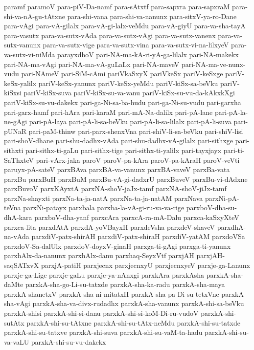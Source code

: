 {paramf
paramoV
para-piV-Da-namf
para-sAtxtf
para-sapxra
para-sapxraM
para-shi-va-nA-gu-tAtxne
para-shi-vana
para-shi-va-nanunx
para-sitxV-ya-ro-Dane
para-vAgi
para-vA-gilalx
para-vA-gi-lalx-veMdu
para-vA-giyU
para-va-sha-tayA
para-vasutx
para-va-sutx-vAda
para-va-sutx-vAgi
para-va-sutx-vanenx
para-va-sutx-vanunx
para-va-sutx-vige
para-va-sutx-vina
para-va-sutx-vi-na-lilxyeV
para-va-sutx-vi-niMda
parayxdhoV
pari-NA-ma-kA-ri-yA-ga-lilalx
pari-NA-makekx
pari-NA-ma-vAgi
pari-NA-ma-vA-guLaLx
pari-NA-maveV
pari-NA-ma-ve-nunx-vudu
pari-NAmeV
pari-SiM-cAmi
pariVkaSxyX
pariVkeSx
pariV-keSxge
pariV-keSx-yalilx
pariV-keSx-yanunx
pariV-keSx-yeMdu
pariV-kiSx-sa-beVku
pariV-kiSxsi
pariV-kiSx-suva
pariV-kiSx-su-va-vanu
pariV-kiSx-su-vu-da-kAkxkXgi
pariV-kiSx-su-vu-dakekx
pari-ga-Ni-sa-ba-hudu
pari-ga-Ni-su-vudu
pari-garxha
pari-garx-hamf
pari-hAra
pari-karaM
pari-mA-Na-dalilx
pari-pA-lane
pari-pA-la-ne-gAgi
pari-pA-laya
pari-pA-li-sa-beVku
pari-pA-li-sa-lilalx
pari-pA-li-suva
pari-pUNaR
pari-paM-thinw
pari-parx-shenxVna
pari-shiV-li-sa-beVku
pari-shiV-lisi
pari-shoV-dhane
pari-shu-dadhx-vAda
pari-shu-dadhx-vA-gilalx
pari-sithxge
pari-sithxti
pari-sithx-ti-gaLu
pari-sithx-tige
pari-sithx-ti-yalilx
pari-tayxjayx
pari-ti-SaThxteV
pari-vArx-jaka
paroV
paroV-pa-kAra
paroV-pa-kAraH
paroV-veVti
paruyx-pA-sateV
parxBAva
parxBA-va-vanunx
parxBA-vaveV
parxBa-vata
parxBu
parxBuH
parxBuM
parxBu-vA-gi-dadxrU
parxBuveV
parxBu-vi-dAdxne
parxBuvoV
parxKAyxtA
parxNA-shoV-jaJx-tamf
parxNA-shoV-jiJx-tamf
parxNa-shayxti
parxNa-ta-ja-natA
parxNa-ta-ja-natAM
parxNava
parxNi-pA-teVna
parxNi-patayx
parxbala
parxba-la-vA-gi-ru-va-va-rige
parxboV-dha-su-dhA-kara
parxboV-dha-yanf
parxcAra
parxcA-ra-mA-Dalu
parxca-kaSxyXteV
parxca-lita
parxdAtA
parxdA-yoVBayxH
parxdeVsha
parxdeV-shaveV
parxdhA-na-vAda
parxdiV-patx-shirAH
parxdiV-patx-shiraH
parxdiV-yatAM
parxdoVSa
parxdoV-Sa-dalUlx
parxdoV-doyxV-ginaH
parxga-ti-gAgi
parxga-ti-yanunx
parxhAlx-da-nanunx
parxhAlx-danu
parxhaq-SeyxVtf
parxjAH
parxjAH-saqSATxvX
parxjA-patiH
parxjecnx
parxjecnxyU
parxjecnxyeV
parxje-ga-Lanunx
parxje-ga-Lige
parxje-gaLu
parxje-ya-nAnxgi
parxkAra
parxkAsha
parxkA-sha-daMte
parxkA-sha-go-Li-su-tatxde
parxkA-sha-ka-radu
parxkA-sha-maya
parxkA-shanetxV
parxkA-sha-ni-mitatxH
parxkA-sha-pa-Di-su-tetxVne
parxkA-sha-vAgi
parxkA-sha-va-divx-rudadhx
parxkA-sha-vanunx
parxkA-shi-sa-beVku
parxkA-shisi
parxkA-shi-si-danu
parxkA-shi-si-koM-Di-ru-vudoV
parxkA-shi-sutAtx
parxkA-shi-su-tAtxne
parxkA-shi-su-tAtx-neMdu
parxkA-shi-su-tatxde
parxkA-shi-su-tatxve
parxkA-shi-suva
parxkA-shi-su-vaM-ta-hadu
parxkA-shi-su-va-vaLU
parxkA-shi-su-vu-dakekx
}
